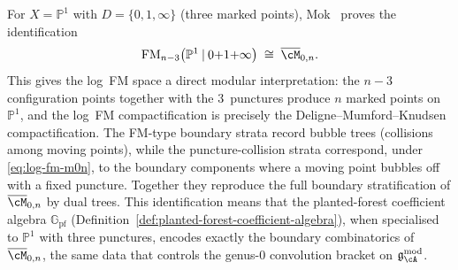 \begin{example}
\label{ex:log-fm-moduli-rational}
For $X = \mathbb{P}^1$ with $D = \{0, 1, \infty\}$ (three marked points),
Mok~\cite[\S3.4.1]{Mok25} proves the identification
\begin{equation}\label{eq:log-fm-m0n}
\operatorname{FM}_{n-3}\bigl(\mathbb{P}^1 \mathbin{|}
 0{+}1{+}\infty\bigr)
\;\cong\;
\overline{\cM}_{0,n}.
\end{equation}
This gives the log~FM space a direct modular interpretation:
the $n-3$ configuration points together with the $3$~punctures
produce $n$ marked points on~$\mathbb{P}^1$, and the log~FM
compactification is precisely the Deligne--Mumford--Knudsen
compactification. The FM-type boundary strata record
bubble trees (collisions among moving points), while the
puncture-collision strata correspond, under
\eqref{eq:log-fm-m0n}, to the boundary components where a
moving point bubbles off with a fixed puncture. Together they
reproduce the full boundary stratification of
$\overline{\cM}_{0,n}$ by dual trees.
This identification means that the planted-forest coefficient
algebra $\mathbb{G}_{\mathrm{pf}}$
(Definition~\ref{def:planted-forest-coefficient-algebra}),
when specialised to $\mathbb{P}^1$ with three punctures, encodes
exactly the boundary combinatorics of
$\overline{\cM}_{0,n}$, the same data that controls the
genus-$0$ convolution bracket on
$\mathfrak{g}^{\mathrm{mod}}_\cA$.
\end{example}

